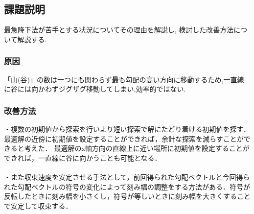 \subsection{課題説明}

最急降下法が苦手とする状況についてその理由を解説し,
検討した改善方法について解説する.

\subsubsection{原因}

「山(谷)」の数は一つにも関わらず最も勾配の高い方向に移動するため,一直線に谷には向かわずジグザグ移動してしまい,効率的ではない.

\subsubsection{改善方法}

・複数の初期値から探索を行いより短い探索で解にたどり着ける初期値を探す．\\
最適解の近傍に初期値を設定することができれば，余計な探索を減らすことができると考えた．
最適解のx軸方向の直線上に近い場所に初期値を設定することができれば，一直線に谷に向かうことも可能となる．\\\\


・また収束速度を安定させる手法として，前回得られた勾配ベクトルと今回得られた勾配ベクトルの符号の変化によって刻み幅の調整をする方法がある．符号が反転したときに刻み幅を小さくし，符号が等しいときに刻み幅を大きくすることで安定して収束する．





